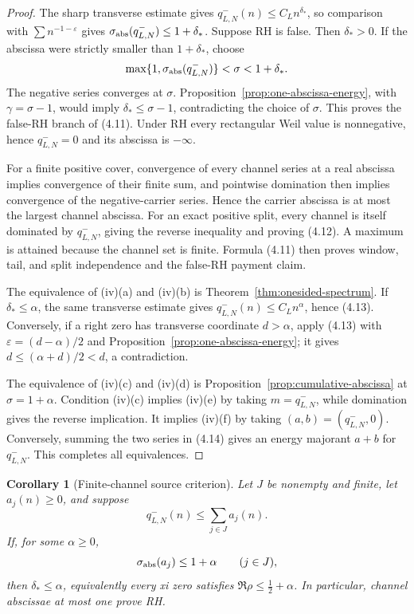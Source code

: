 \documentclass[11pt]{article}
\newtheorem{corollary}[theorem]{Corollary}
\begin{document}
\begin{proof}
The sharp transverse estimate gives
$q_{L,N}^-(n)\le C_Ln^{\delta_*}$, so comparison with
$\sum n^{-1-\varepsilon}$ gives
$\sigma_{\rm abs}(q_{L,N}^-)\le1+\delta_*$.  Suppose RH is false.  Then
$\delta_*>0$.  If the abscissa were strictly smaller than $1+\delta_*$, choose
\[
 \max\{1,\sigma_{\rm abs}(q_{L,N}^-)\}<\sigma<1+\delta_*.
\]
The negative series converges at $\sigma$.  Proposition~\ref{prop:one-abscissa-energy}, with
$\gamma=\sigma-1$, would imply $\delta_*\le\sigma-1$, contradicting the choice of $\sigma$.
This proves the false-RH branch of \textup{(4.11)}.  Under RH every rectangular Weil value is
nonnegative, hence $q_{L,N}^-=0$ and its abscissa is $-\infty$.

For a finite positive cover, convergence of every channel series at a real abscissa implies
convergence of their finite sum, and pointwise domination then implies convergence of the
negative-carrier series.  Hence the carrier abscissa is at most the largest channel abscissa.
For an exact positive split, every channel is itself dominated by $q_{L,N}^-$, giving the reverse
inequality and proving \textup{(4.12)}.  A maximum is attained because the channel set is finite.
Formula \textup{(4.11)} then proves window, tail, and split independence and the false-RH payment
claim.

The equivalence of \textup{(iv)(a)} and \textup{(iv)(b)} is
Theorem~\ref{thm:onesided-spectrum}.  If $\delta_*\le\alpha$, the same transverse estimate gives
$q_{L,N}^-(n)\le C_Ln^\alpha$, hence \textup{(4.13)}.  Conversely, if a right zero has transverse
coordinate $d>\alpha$, apply \textup{(4.13)} with
$\varepsilon=(d-\alpha)/2$ and Proposition~\ref{prop:one-abscissa-energy}; it gives
$d\le(\alpha+d)/2<d$, a contradiction.

The equivalence of \textup{(iv)(c)} and \textup{(iv)(d)} is
Proposition~\ref{prop:cumulative-abscissa} at $\sigma=1+\alpha$.
Condition \textup{(iv)(c)} implies \textup{(iv)(e)} by taking $m=q_{L,N}^-$, while domination
gives the reverse implication.  It implies \textup{(iv)(f)} by taking
$(a,b)=(q_{L,N}^-,0)$.  Conversely, summing the two series in \textup{(4.14)} gives an
energy majorant $a+b$ for $q_{L,N}^-$.  This completes all equivalences.
\end{proof}

\begin{corollary}[Finite-channel source criterion]
\label{cor:finite-channel-source}
Let $J$ be nonempty and finite, let $a_j(n)\ge0$, and suppose
\[
 q_{L,N}^-(n)\le\sum_{j\in J}a_j(n).
\]
If, for some $\alpha\ge0$,
\[
 \sigma_{\rm abs}(a_j)\le1+\alpha\qquad(j\in J),
\]
then $\delta_*\le\alpha$, equivalently every xi zero satisfies
$\Re\rho\le\frac12+\alpha$.  In particular, channel abscissae at most one prove RH.
\end{corollary}
\end{document}
